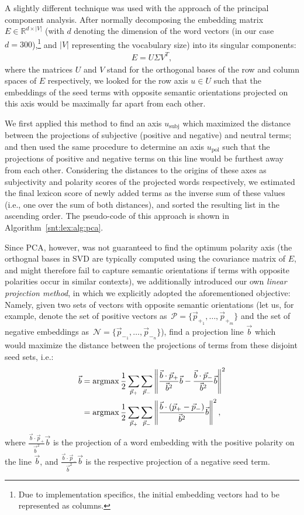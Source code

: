 A slightly different technique was used with the approach of the
principal component analysis.  After normally decomposing the
embedding matrix~$E\in\mathbb{R}^{d\times|V|}$ (with $d$ denoting the
dimension of the word vectors (in our case $d = 300$),\footnote{Due to
  implementation specifics, the initial embedding vectors had to be
  represented as columns.} and $|V|$ representing the vocabulary size)
into its singular components:
\begin{align*}
  E = U \Sigma V^T,
\end{align*}
where the matrices $U$ and $V$ stand for the orthogonal bases of the
row and column spaces of $E$ respectively, we looked for the row axis
$u\in U$ such that the embeddings of the seed terms with opposite
semantic orientations projected on this axis would be maximally far
apart from each other.

We first applied this method to find an axis $u_{\textrm{subj}}$ which
maximized the distance between the projections of subjective (positive
and negative) and neutral terms; and then used the same procedure to
determine an axis $u_{\textrm{pol}}$ such that the projections of
positive and negative terms on this line would be furthest away from
each other.  Considering the distances to the origins of these axes as
subjectivity and polarity scores of the projected words respectively,
we estimated the final lexicon score of newly added terms as the
inverse sum of these values (i.e., one over the sum of both
distances), and sorted the resulting list in the ascending order.  The
pseudo-code of this approach is shown in
Algorithm~\ref{snt:lex:alg:pca}.

Since PCA, however, was not guaranteed to find the optimum polarity
axis (the orthognal bases in SVD are typically computed using the
covariance matrix of $E$, and might therefore fail to capture semantic
orientations if terms with opposite polarities occur in similar
contexts), we additionally introduced our own \emph{linear projection
  method}, in which we explicitly adopted the aforementioned
objective: Namely, given two sets of vectors with opposite semantic
orientations (let us, for example, denote the set of positive vectors
as~$\mathcal{P} = \{\vec{p}_{+_1},\ldots,\vec{p}_{+_m}\}$ and the set
of negative embeddings
as~$\mathcal{N} = \{\vec{p}_{-_1},\ldots,\vec{p}_{-_n}\}$), find a
projection line $\vec{b}$ which would maximize the distance between
the projections of terms from these disjoint seed sets, i.e.: {\small%
\begin{align}
  \small
  \vec{b} &=\argmax\frac{1}{2}\sum_{\vec{p}_+}\sum_{\vec{p}_-}%
  \left\lVert\frac{\vec{b}\cdot\vec{p}_+}{\vec{b}^2}\vec{b}%
  - \frac{\vec{b}\cdot\vec{p}_-}{\vec{b}^2}\vec{b}\right\rVert^2\\
  &=\argmax\frac{1}{2}\sum_{\vec{p}_+}\sum_{\vec{p}_-}\left\lVert\frac{\vec{b}%
    \cdot\left(\vec{p}_{+}-\vec{p}_{-}\right)}{\vec{b}^2}\vec{b}\right\rVert^2,\label{eq:f}%
\end{align}\normalsize}%
where $\frac{\vec{b}\cdot\vec{p}_+}{\vec{b}^2}\vec{b}$ is the
projection of a word embedding with the positive polarity on the line
$\vec{b}$, and $\frac{\vec{b}\cdot\vec{p}_-}{\vec{b}^2}\vec{b}$ is the
respective projection of a negative seed term.


